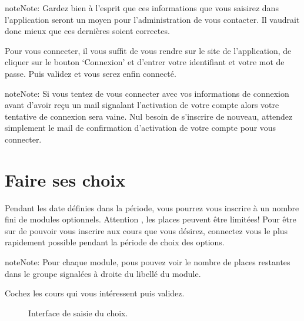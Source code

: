 \documentclass[letterpaper,10pt,french]{sphinxmanual}
\begin{document}
\begin{notice}{note}{Note:}
Gardez bien à l’esprit que ces informations que vous saisirez dans l’application seront un moyen pour l’administration de vous contacter. Il vaudrait donc mieux que ces dernières soient correctes.
\end{notice}

Pour vous connecter, il vous suffit de vous rendre sur le site de l’application, de cliquer sur le bouton ‘Connexion’ et d’entrer votre identifiant et votre mot de passe. Puis validez et vous serez enfin connecté.

\begin{notice}{note}{Note:}
Si vous tentez de vous connecter avec vos informations de connexion avant d’avoir reçu un mail signalant l’activation de votre compte alors votre tentative de connexion sera vaine. Nul besoin de s’inscrire de nouveau, attendez simplement le mail de confirmation d’activation de votre compte pour vous connecter.
\end{notice}


\section{Faire ses choix}
\label{etudiant:faire-ses-choix}
Pendant les date définies dans la période, vous pourrez vous inscrire à un nombre fini de modules optionnels. Attention , les places peuvent être limitées! Pour être sur de pouvoir vous inscrire aux cours que vous désirez, connectez vous le plus rapidement possible pendant la période de choix des options.

\begin{notice}{note}{Note:}
Pour chaque module, pous pouvez voir le nombre de places restantes dans le groupe signalées à droite du libellé du module.
\end{notice}

Cochez les cours qui vous intéressent puis validez.
\begin{figure}[htbp]
\centering
\capstart

\caption{Interface de saisie du choix.}\end{figure}
\end{document}

